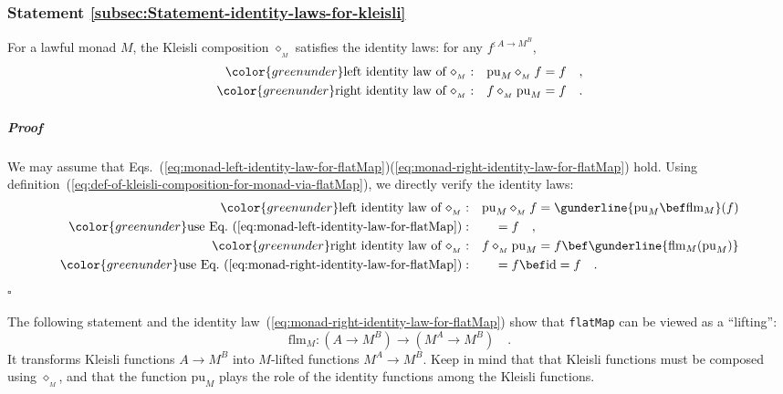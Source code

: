\subsubsection{Statement \label{subsec:Statement-identity-laws-for-kleisli}\ref{subsec:Statement-identity-laws-for-kleisli}}

For a lawful monad $M$, the Kleisli composition $\diamond_{_{M}}$
satisfies the identity laws: for any $f^{:A\rightarrow M^{B}}$,
\begin{align}
{\color{greenunder}\text{left identity law of }\diamond_{_{M}}:}\quad & \text{pu}_{M}\diamond_{_{M}}f=f\quad,\label{eq:kleisli-left-identity-law}\\
{\color{greenunder}\text{right identity law of }\diamond_{_{M}}:}\quad & f\diamond_{_{M}}\text{pu}_{M}=f\quad.\label{eq:kleisli-right-identity-law}
\end{align}


\subparagraph{Proof}

We may assume that Eqs.~(\ref{eq:monad-left-identity-law-for-flatMap})\textendash (\ref{eq:monad-right-identity-law-for-flatMap})
hold. Using definition~(\ref{eq:def-of-kleisli-composition-for-monad-via-flatMap}),
we directly verify the identity laws:
\begin{align*}
{\color{greenunder}\text{left identity law of }\diamond_{_{M}}:}\quad & \text{pu}_{M}\diamond_{_{M}}f=\gunderline{\text{pu}_{M}\bef\text{flm}_{M}}(f)\\
{\color{greenunder}\text{use Eq.~(\ref{eq:monad-left-identity-law-for-flatMap})}:}\quad & \quad=f\quad,\\
{\color{greenunder}\text{right identity law of }\diamond_{_{M}}:}\quad & f\diamond_{_{M}}\text{pu}_{M}=f\bef\gunderline{\text{flm}_{M}(\text{pu}_{M})}\\
{\color{greenunder}\text{use Eq.~(\ref{eq:monad-right-identity-law-for-flatMap})}:}\quad & \quad=f\bef\text{id}=f\quad.
\end{align*}
$\square$

The following statement and the identity law~(\ref{eq:monad-right-identity-law-for-flatMap})
show that \lstinline!flatMap! can be viewed as a \textsf{``}lifting\textsf{''}:
\[
\text{flm}_{M}:(A\rightarrow M^{B})\rightarrow(M^{A}\rightarrow M^{B})\quad.
\]
It transforms Kleisli functions $A\rightarrow M^{B}$ into $M$-lifted
functions $M^{A}\rightarrow M^{B}$. Keep in mind that that Kleisli
functions must be composed using $\diamond_{_{M}}$, and that the
function $\text{pu}_{M}$ plays the role of the identity functions
among the Kleisli functions.

